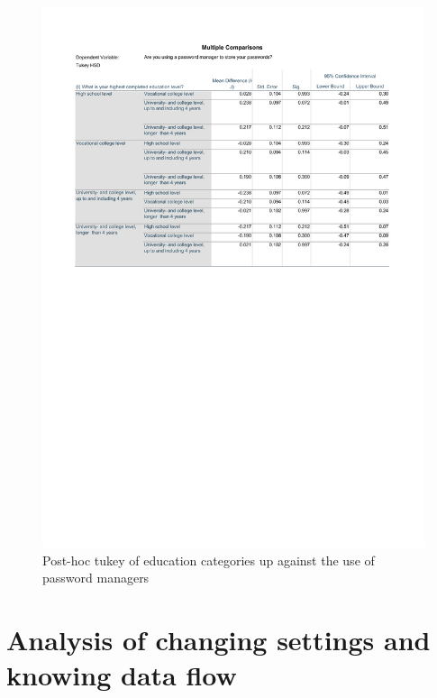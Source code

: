 \begin{figure}[!h]
    \centering
    \includegraphics[scale=0.7]{figures/tables/anova_education_tukey.pdf}
    \caption{Post-hoc tukey of education categories up against the use of password managers}
    \label{fig:anova_education_tukey}
\end{figure}

\chapter{Analysis of changing settings and knowing data flow}

